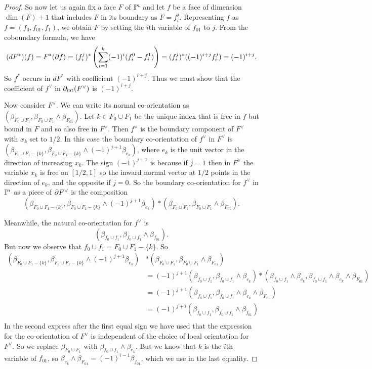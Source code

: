 \begin{proof}
So now let us again fix a face $F$ of $\mathbb{I}^n$ and let $f$ be a face of dimension $\dim(F)+1$ that includes $F$ in its boundary as $F=f_i^j$. Representing $f$ as $f=(f_0,f_{01},f_1)$, we obtain $F$ by setting the $i$th variable of $f_{01}$ to $j$. From the coboundary formula, we have
\begin{equation*}
(dF^*)(f)=F^*(\partial f)=(f_i^j)^*\left(\sum_{i=1}^k (-1)^i(f_i^0-f^1_i)\right)
=(f_i^j)^*((-1)^{i+j}f_i^j)=(-1)^{i+j}.
\end{equation*}
So
$f^*$ occurs in $dF^*$ with coefficient $(-1)^{i+j}$. Thus we must show that the coefficient of $f^\vee$ in $\partial_{\text{int}} (F^\vee)$ is $(-1)^{i+j}$.

Now consider $F^\vee$. We can write its normal co-orientation as $(\beta_{F_0\cup F_1},\beta_{F_0\cup F_1}\wedge \beta_{F_{01}})$. Let $k\in F_0\cup F_1$ be the unique index that is free in $f$ but bound in $F$ and so also free in $F^\vee$. Then $f^\vee$ is the boundary component of $F^\vee$ with $x_k$ set to $1/2$. In this case the boundary co-orientation of $f^\vee$ in $F^\vee$ is $(\beta_{F_0\cup F_1-\{k\}},\beta_{F_0\cup F_1-\{k\}}\wedge (-1)^{j+1} \beta_{e_k})$, where $e_k$ is the unit vector in the direction of increasing $x_k$. The sign $(-1)^{j+1}$ is because if $j=1$ then in $F^\vee$ the variable $x_k$ is free on $[1/2,1]$ so the inward normal vector at $1/2$ points in the direction of $e_k$, and the opposite if $j=0$. So the boundary co-orientation for $f^\vee$ in $\mathbb{I}^n$ as a piece of $\partial F^\vee$ is the composition $$(\beta_{F_0\cup F_1-\{k\}},\beta_{F_0\cup F_1-\{k\}}\wedge (-1)^{j+1} \beta_{e_k})*(\beta_{F_0\cup F_1},\beta_{F_0\cup F_1}\wedge \beta_{F_{01}}).$$

Meanwhile, the natural co-orientation for $f^\vee$ is $$(\beta_{f_0\cup f_1},\beta_{f_0\cup f_1}\wedge \beta_{f_{01}}).$$ But now we observe that $f_0\cup f_1=F_0\cup F_1-\{k\}$. So
\begin{align*}
(\beta_{F_0\cup F_1-\{k\}},\beta_{F_0\cup F_1-\{k\}}\wedge (-1)^{j+1} \beta_{e_k})&*(\beta_{F_0\cup F_1},\beta_{F_0\cup F_1}\wedge \beta_{F_{01}})\\
&=(-1)^{j+1}(\beta_{f_0\cup f_1},\beta_{f_0\cup f_1}\wedge  \beta_{e_k})*(\beta_{f_0\cup f_1}\wedge  \beta_{e_k},\beta_{f_0\cup f_1}\wedge  \beta_{e_k}\wedge \beta_{F_{01}})\\
&=(-1)^{j+1}(\beta_{f_0\cup f_1},\beta_{f_0\cup f_1}\wedge  \beta_{e_k}\wedge \beta_{F_{01}})\\
&=(-1)^{j+i}(\beta_{f_0\cup f_1},\beta_{f_0\cup f_1}\wedge \beta_{f_{01}})\\
\end{align*}
In the second express after the first equal sign we have used that the expression for the co-orientation of $F^\vee$ is independent of the choice of local orientation for $F^\vee$. So we replace $\beta_{F_0\cup F_1}$ with $\beta_{f_0\cup f_1}\wedge  \beta_{e_k}$. But we know that $k$ is the $i$th variable of $f_{01}$, so
$\beta_{e_k}\wedge \beta_{F_{01}}=(-1)^{i-1}\beta_{f_{01}}$, which we use in the last equality.
\end{proof}


